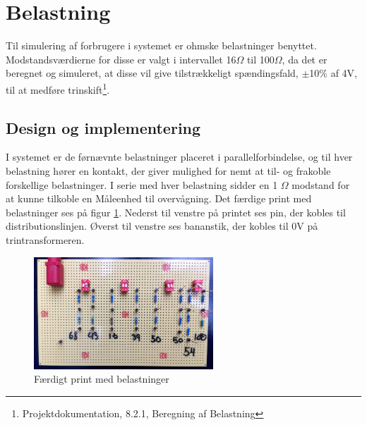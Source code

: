 
\section{Belastning}

Til simulering af forbrugere i systemet er ohmske belastninger benyttet. Modstandsværdierne for disse er valgt i intervallet 16$\Omega$ til 100$\Omega$, da det er beregnet og simuleret, at disse vil give tilstrækkeligt spændingsfald, $\pm$10$\%$ af 4V, til at medføre trinskift\footnote{Projektdokumentation, 8.2.1, Beregning af Belastning}. 

\subsection{Design og implementering}

I systemet er de førnævnte belastninger placeret i parallelforbindelse, og til hver belastning hører en kontakt, der giver mulighed for nemt at til- og frakoble forskellige belastninger. I serie med hver belastning sidder en 1 $\Omega$ modstand for at kunne tilkoble en Måleenhed til overvågning. Det færdige print med belastninger ses på figur \ref{fig:Belastning}. Nederst til venstre på printet ses pin, der kobles til distributionslinjen. Øverst til venstre ses bananstik, der kobles til 0V på trintransformeren. 

\begin{figure}[H]
	\centering
	\includegraphics[width=0.6\textwidth]{figure/Belastningskreds}
	\caption{Færdigt print med belastninger}
	\label{fig:Belastning}
\end{figure}
